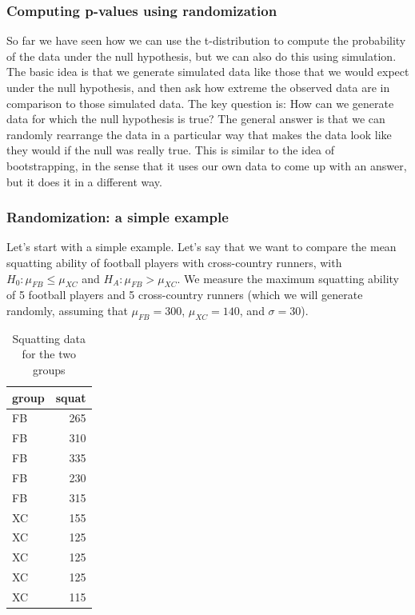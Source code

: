 \documentclass[12pt,]{book}
\theoremstyle{definition}
\theoremstyle{definition}
\theoremstyle{definition}
\theoremstyle{remark}
\begin{document}
\hypertarget{computing-p-values-using-randomization}{%
\subsubsection{Computing p-values using randomization}\label{computing-p-values-using-randomization}}

So far we have seen how we can use the t-distribution to compute the probability of the data under the null hypothesis, but we can also do this using simulation. The basic idea is that we generate simulated data like those that we would expect under the null hypothesis, and then ask how extreme the observed data are in comparison to those simulated data. The key question is: How can we generate data for which the null hypothesis is true? The general answer is that we can randomly rearrange the data in a particular way that makes the data look like they would if the null was really true. This is similar to the idea of bootstrapping, in the sense that it uses our own data to come up with an answer, but it does it in a different way.

\hypertarget{randomization-a-simple-example}{%
\subsubsection{Randomization: a simple example}\label{randomization-a-simple-example}}

Let's start with a simple example. Let's say that we want to compare the mean squatting ability of football players with cross-country runners, with \(H_0: \mu_{FB} \le \mu_{XC}\) and \(H_A: \mu_{FB} > \mu_{XC}\). We measure the maximum squatting ability of 5 football players and 5 cross-country runners (which we will generate randomly, assuming that \(\mu_{FB} = 300\), \(\mu_{XC} = 140\), and \(\sigma = 30\)).

\begin{table}

\caption{\label{tab:squatPlot}Squatting data for the two groups}
\centering
\begin{tabular}[t]{l|r}
\hline
group & squat\\
\hline
FB & 265\\
\hline
FB & 310\\
\hline
FB & 335\\
\hline
FB & 230\\
\hline
FB & 315\\
\hline
XC & 155\\
\hline
XC & 125\\
\hline
XC & 125\\
\hline
XC & 125\\
\hline
XC & 115\\
\hline
\end{tabular}
\end{table}
\end{document}
